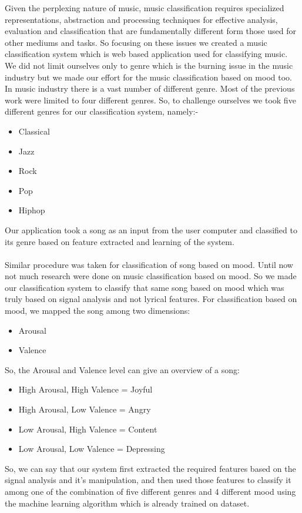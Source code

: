 Given the perplexing nature of music, music classification requires specialized representations, abstraction and processing techniques for effective
analysis, evaluation and classification that are fundamentally different form those used for other mediums and tasks. So focusing on these issues
we created a music classification system which is web based application used for classifying music. We did not limit ourselves only to genre which is
the burning issue in the music industry but we made our effort for the music classification based on mood too. In music industry there is a vast
number of different genre. Most of the previous work were limited to four different genres. So, to challenge ourselves we took five different genres
for our classification system, namely:-
\begin{itemize}
        \item Classical
        \item Jazz
        \item Rock
        \item Pop
        \item Hiphop
\end{itemize}
Our application took a song as an input from the user computer and classified to its genre based on feature extracted and learning of the system.\\ \\ Similar procedure was taken for classification of song based on mood. Until now not much research were done on music classification based on mood.
So we made our classification system to classify that same song based on mood which was truly based on signal analysis and not lyrical features.
For classification based on mood, we mapped the song among two dimensions: 
\begin{itemize}
        \item Arousal 
        \item Valence
\end{itemize}
So, the Arousal and Valence level can give an overview of a song:
\begin{itemize}
        \item High Arousal, High Valence = Joyful
        \item High Arousal, Low Valence  = Angry
        \item Low Arousal, High Valence  = Content
        \item Low Arousal, Low Valence   = Depressing
\end{itemize}
So, we can say that our system first extracted the required features based on the signal analysis and it's manipulation, and then used 
those features to classify it among one of the combination of five different genres and 4  different mood using the machine learning algorithm
which is already trained on dataset.\\


